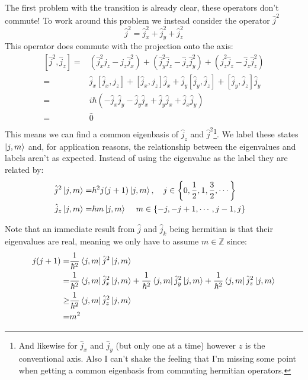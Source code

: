 The first problem with the transition is already clear,
these operators don't commute!
To work around this problem we instead consider the operator $\hat{j}^2$
\[\hat{j}^2 = \hat{j}_x^2+\hat{j}_y^2+\hat{j}_z^2\]
This operator does commute with the projection onto the axis:
\begin{equation*}
\begin{aligned}
	[\hat{j}^2,\hat{j}_z] =& (\hat{j}_x^2j_z-j_z\hat{j}_x^2)+(\hat{j}_y^2\hat{j}_z-\hat{j}_z\hat{j}_y^2)+(\hat{j}_z^2\hat{j}_z-\hat{j}_z\hat{j}_z^2) \\
	=& \hat{j}_x[\hat{j}_x,j_z]+[\hat{j}_x,j_z]\hat{j}_x+\hat{j}_y[\hat{j}_y,\hat{j}_z]+[\hat{j}_y,\hat{j}_z]\hat{j}_y \\
	=& i\hbar(-\hat{j}_x\hat{j}_y-\hat{j}_y\hat{j}_x+\hat{j}_y\hat{j}_x+\hat{j}_x\hat{j}_y) \\
	=& \hat{0}\\
\end{aligned}
\end{equation*}
This means we can find a common eigenbasis of $\hat{j}_z$ and $\hat{j}^2$\footnote{
	And likewise for $\hat{j}_x$ and $\hat{j}_y$ (but only one at a time) however $z$ is the conventional axis.
	Also I can't shake the feeling that I'm missing some point when getting a common eigenbasis from commuting hermitian operators.}.
We label these states $\left|j,m\right\rangle$ and,
for application reasons,
the relationship between the eigenvalues and labels aren't as expected.
Instead of using the eigenvalue as the label they are related by:
\begin{equation*}
\begin{aligned}
	\hat{j}^2\left|j,m\right\rangle =& \hbar^2 j(j+1)\left|j,m\right\rangle,\quad j\in\left\{0,\frac{1}{2},1,\frac{3}{2},\cdots\right\}&\\
	\hat{j}_z\left|j,m\right\rangle =& \hbar m\left|j,m\right\rangle\,\quad m\in\left\{-j,-j+1,\cdots,j-1,j\right\}&\\
\end{aligned}
\end{equation*}

Note that an immediate result from $\hat{j}$ and $\hat{j}_k$ being hermitian is that their eigenvalues are real,
meaning we only have to assume $m\in\mathbb{Z}$ since:
\[\begin{aligned}
	j(j+1) =& \frac{1}{\hbar^2}\left\langle j,m\right|\hat{j}^2\left|j,m\right\rangle\\
	=&\frac{1}{\hbar^2}\left\langle j,m\right|\hat{j}^2_x\left|j,m\right\rangle+\frac{1}{\hbar^2}\left\langle j,m\right|\hat{j}^2_y\left|j,m\right\rangle+\frac{1}{\hbar^2}\left\langle j,m\right|\hat{j}^2_z\left|j,m\right\rangle\\
	\geq& \frac{1}{\hbar^2}\left\langle j,m\right|\hat{j}_z^2\left|j,m\right\rangle\\
	=& m^2
\end{aligned}\]

